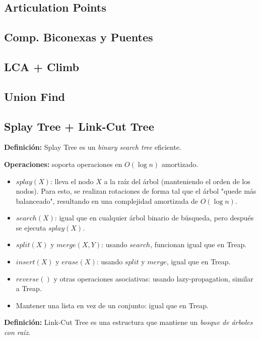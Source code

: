 {\subsection{Articulation Points}
\subsection{Comp. Biconexas y Puentes}
\subsection{LCA + Climb}
\subsection{Union Find} 

\subsection{Splay Tree + Link-Cut Tree}
\textbf{Definición:} Splay Tree es un \emph{binary search tree} eficiente.

\textbf{Operaciones:} soporta operaciones en $O(\log{}n)$ amortizado.
\begin{itemize}
    \item $splay(X)$: lleva el nodo $X$ a la raíz del árbol (manteniendo el orden de los nodos). 
    Para esto, se realizan rotaciones de forma tal que el árbol "quede más balanceado", resultando
    en una complejidad amortizada de $O(\log{}n)$.
    \item $search(X)$: igual que en cualquier árbol binario de búsqueda, pero después se ejecuta $splay(X)$.
    \item $split(X)$ y $merge(X, Y)$: usando $search$, funcionan igual que en Treap.
    \item $insert(X)$ y $erase(X)$: usando $split$ y $merge$, igual que en Treap.
    \item $reverse()$ y otras operaciones asociativas: usando lazy-propagation, similar a Treap.
    \item Mantener una lista en vez de un conjunto: igual que en Treap.
\end{itemize}

\textbf{Definición:} Link-Cut Tree es una estructura que mantiene un \emph{bosque de árboles con raíz}.

}
